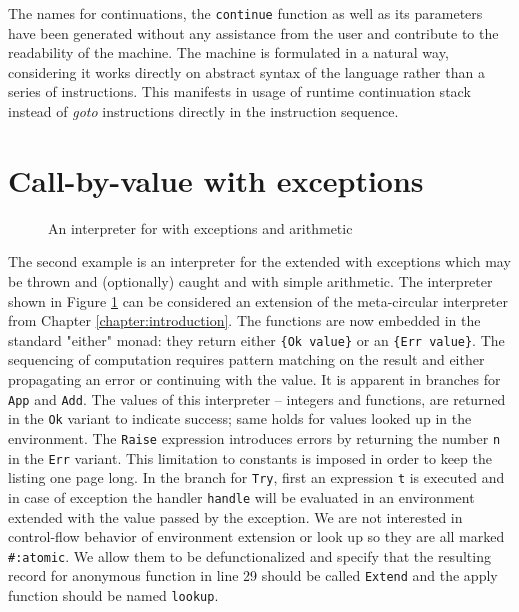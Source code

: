 The names for continuations, the \lstinline!continue! function as well as its parameters have been generated without any assistance from the user and contribute to the readability of the machine.
The machine is formulated in a natural way, considering it works directly on abstract syntax of the language rather than a series of instructions.
This manifests in usage of runtime continuation stack instead of \textit{goto} instructions directly in the instruction sequence.

\section{Call-by-value \LC{} with exceptions}
\begin{figure}
  
  \caption{An interpreter for \LC{} with exceptions and arithmetic}
  \label{fig:studies-exceptions}
\end{figure}

The second example is an interpreter for the \LC{} extended with exceptions which may be thrown and (optionally) caught and with simple arithmetic.
The interpreter shown in Figure \ref{fig:studies-exceptions} can be considered an extension of the meta-circular interpreter from Chapter \ref{chapter:introduction}.
The functions are now embedded in the standard "either" monad: they return either \lstinline!{Ok value}! or an \lstinline!{Err value}!.
The sequencing of computation requires pattern matching on the result and either propagating an error or continuing with the value.
It is apparent in branches for \lstinline!App! and \lstinline!Add!.
The values of this interpreter -- integers and functions, are returned in the \lstinline!Ok! variant to indicate success; same holds for values looked up in the environment.
The \lstinline!Raise! expression introduces errors by returning the number \lstinline!n! in the \lstinline!Err! variant.
This limitation to constants is imposed in order to keep the listing one page long.
In the branch for \lstinline!Try!, first an expression \lstinline!t! is executed and in case of exception the handler \lstinline!handle! will be evaluated in an environment extended with the value passed by the exception.
We are not interested in control-flow behavior of environment extension or look up so they are all marked \lstinline!#:atomic!.
We allow them to be defunctionalized and specify that the resulting record for anonymous function in line 29 should be called \lstinline!Extend! and the apply function should be named \lstinline!lookup!.

